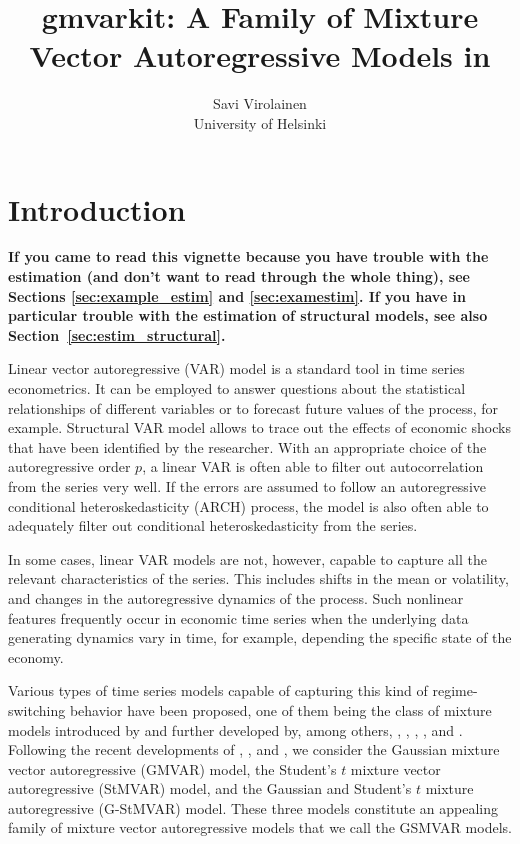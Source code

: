 \documentclass[nojss]{jss} %
\author{Savi Virolainen\\ University of Helsinki}
\title{gmvarkit: A Family of Mixture Vector Autoregressive Models in \proglang{R}}
\begin{document}
\section{Introduction}
\textbf{If you came to read this vignette because you have trouble with the estimation (and don't want to read through the whole thing), see Sections \ref{sec:example_estim} and \ref{sec:examestim}. If you have in particular trouble with the estimation of structural models, see also Section~\ref{sec:estim_structural}.}

Linear vector autoregressive (VAR) model is a standard tool in time series econometrics. It can be employed to answer questions about the statistical relationships of different variables or to forecast future values of the process, for example. Structural VAR model allows to trace out the effects of economic shocks that have been identified by the researcher. With an appropriate choice of the autoregressive order $p$, a linear VAR is often able to filter out autocorrelation from the series very well. If the errors are assumed to follow an autoregressive conditional heteroskedasticity (ARCH) process, the model is also often able to adequately filter out conditional heteroskedasticity from the series.

In some cases, linear VAR models are not, however, capable to capture all the relevant characteristics of the series. This includes shifts in the mean or volatility, and changes in the autoregressive dynamics of the process. Such nonlinear features frequently occur in economic time series when the underlying data generating dynamics vary in time, for example, depending the specific state of the economy.

Various types of time series models capable of capturing this kind of regime-switching behavior have been proposed, one of them being the class of mixture models introduced by \cite{Le+Martin+Raftery:1996} and further developed by, among others, \cite{Kalliovirta+Meitz+Saikkonen:2015}, \cite{Kalliovirta+Meitz+Saikkonen:2015}, \cite{Meitz+Preve+Saikkonen:2021}, \cite{Virolainen:2020}, and \cite{Virolainen:2021, Virolainen2:2021}. Following the recent developments of \cite{Kalliovirta+Meitz+Saikkonen:2016}, \cite{Virolainen:2020}, and \cite{Virolainen2:2021}, we consider the Gaussian mixture vector autoregressive (GMVAR) model, the Student's $t$ mixture vector autoregressive (StMVAR) model, and the Gaussian and Student's $t$ mixture autoregressive (G-StMVAR) model. These three models constitute an appealing family of mixture vector autoregressive models that we call the GSMVAR models.
\end{document}
